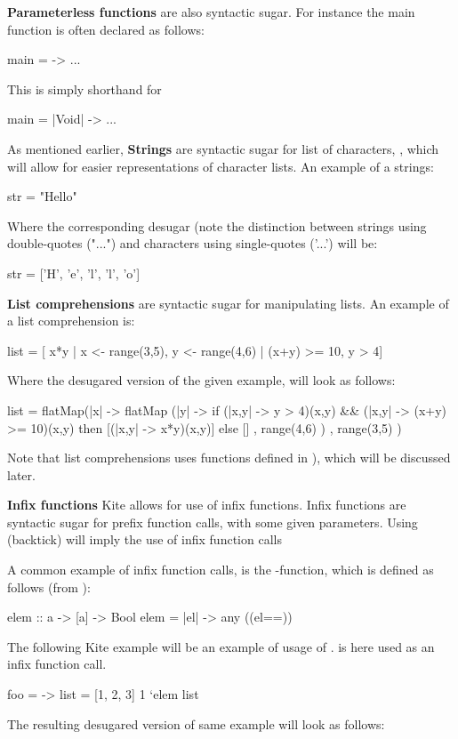 \textbf{Parameterless functions} are also syntactic sugar. For instance the main function is often declared as follows:

\begin{kite}
main = -> {
  ...
}
\end{kite}

This is simply shorthand for

\begin{kite}
main = |Void| -> {
  ...
}
\end{kite}

As mentioned earlier, \textbf{Strings} are syntactic sugar for list of characters, , which will allow for easier representations of character lists. An example of a strings:

\begin{kite}
str = "Hello"
\end{kite}

Where the corresponding desugar (note the distinction between strings using double-quotes ("...") and characters using single-quotes ('...') will be:

\begin{kite}
str = ['H', 'e', 'l', 'l', 'o']
\end{kite}

\label{sec:ex-listcomp}
\textbf{List comprehensions} are syntactic sugar for manipulating lists. An example of a list comprehension is:

\begin{kite}
list = [ x*y | x <- range(3,5), y <- range(4,6) | (x+y) >= 10, y > 4]
\end{kite}

Where the desugared version of the given example, will look as follows:

\begin{kite}
list =
flatMap(|x| -> {
  flatMap (|y| -> {
    if (|x,y| -> {y > 4})(x,y) && (|x,y| -> {(x+y) >= 10})(x,y)
       then [(|x,y| -> {x*y})(x,y)]
       else []
  } , range(4,6) )
}, range(3,5) )
\end{kite}

Note that list comprehensions uses functions defined in
), which will be discussed later.

\textbf{Infix functions} Kite allows for use of infix functions. Infix
functions are syntactic sugar for prefix function calls, with some
given parameters. Using  (backtick) will imply the use of
infix function calls

A common example of infix function calls, is the 
-function, which is defined as follows (from ):
\begin{kite}
  elem :: a -> [a] -> Bool
  elem = |el| -> {
    any ((el==))
  }
\end{kite}
The following Kite example will be an example of usage of
.  is here used as an infix function call.
\begin{kite}
  foo =  -> {
    list = [1, 2, 3]
    1 `elem list
  }
\end{kite}
The resulting desugared version of same example will look as follows:

